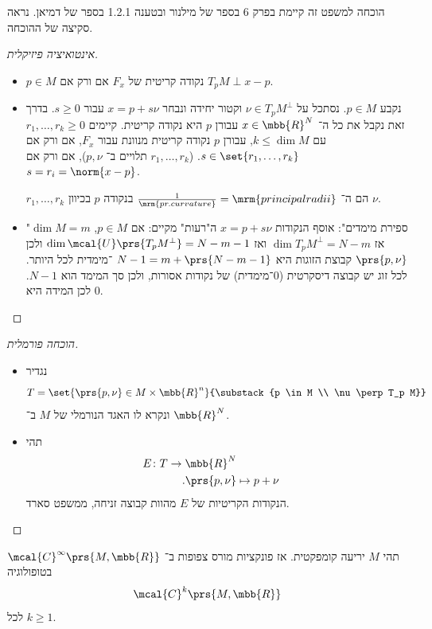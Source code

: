 \documentclass[a4paper,10pt,twoside,openany]{book}
\begin{document}
הוכחה למשפט זה קיימת בפרק 6 בספר של מילנור ובטענה 1.2.1 בספר של דמיאן.
נראה סקיצה של ההוכחה.



\begin{proof}[אינטואיציה פיזיקלית]
\begin{itemize}
\item $p \in M$
נקודה קריטית של
$F_x$
אם ורק אם
$T_p M \perp x - p$.
\item נקבע
$p \in M$.
נסתכל על
$\nu \in T_p M^\perp$
וקטור יחידה ונבחר
$x = p + s \nu$
עבור
$s \geq 0$.
בדרך זאת נקבל את כל ה־%
$x \in \mbb{R}^N$
עבורן
$p$
היא נקודה קריטית.
קיימים
$r_1, \ldots, r_k \geq 0$
עם
$k \leq \dim M$,
עבורן
$p$
נקודה קריטית מנוונת עבור
$F_x$,
אם ורק אם
$s \in \set{r_1, \ldots, r_k}$.
($r_1, \ldots, r_k$
תלויים ב־%
$p,\nu$),
אם ורק אם
$s = r_i = \norm{x - p}$.

$r_1, \ldots, r_k$
הם ה־%
$\frac{1}{\mrm{pr. curvature}} = \mrm{principal radii}$
בנקודה
$p$
בכיוון
$\nu$.

\item "ספירת מימדים":
אוסף הנקודות
$x = p + s\nu$
ה"רעות" מקיים:
אם
$p \in M$, $\dim M = m$
אז
$\dim T_p M^\perp = N - m$
ואז
$\dim \mcal{U}\prs{T_p M^\perp} = N-m-1$
ולכן
$\prs{p,\nu}$
קבוצת הזוגות היא
$N-1 = m + \prs{N-m-1}$%
־מימדית לכל היותר.
לכל זוג יש קבוצה דיסקרטית (0־מימדית) של נקודות אסורות, ולכן סך המימד הוא
$N-1$.
לכן המידה היא
$0$.
\end{itemize}
\end{proof}

\begin{proof}[הוכחה פורמלית]
\begin{itemize}
\item נגדיר
\[T = \set{\prs{p,\nu} \in M \times \mbb{R}^n}{\substack{p \in M \\ \nu \perp T_p M}}\]
ונקרא לו האגד הנורמלי של
$M$
ב־%
$\mbb{R}^N$.
\item
תהי
\begin{align*}
E \colon T \to \mbb{R}^N \\
\text{.} \prs{p,\nu} &\mapsto p + \nu
\end{align*}
הנקודות הקריטיות של
$E$
מהוות קבוצה זניחה, ממשפט סארד.
\end{itemize}
\end{proof}

\begin{theorem}
תהי
$M$
יריעה קומפקטית. אז פונקציות מורס צפופות ב־%
$\mcal{C}^\infty\prs{M, \mbb{R}}$
בטופולוגיה
\[\mcal{C}^k\prs{M,\mbb{R}}\]
לכל
$k \geq 1$.
\end{theorem}
\end{document}
